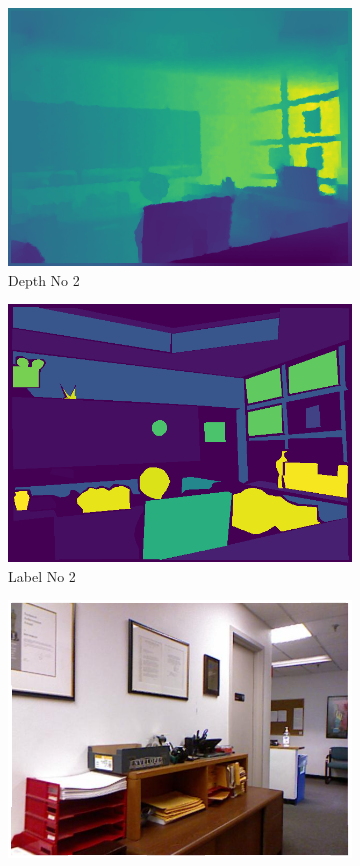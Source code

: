 \documentclass[a4paper, openany]{book}
\begin{document}
\begin{figure}[ht]
\begin{subfigure}[b]{0.3\linewidth}
    \includegraphics[width=\linewidth]{images/depthNo12.png}
    \caption{Depth No 2}
  \end{subfigure}
    \begin{subfigure}[b]{0.3\linewidth}
    \includegraphics[width=\linewidth]{images/labelNo12.png}
    \caption{Label No 2}
  \end{subfigure}
  \begin{subfigure}[b]{0.3\linewidth}
    \includegraphics[width=\linewidth]{images/imgNo8.png}

\end{subfigure}
\end{figure}
\end{document}
